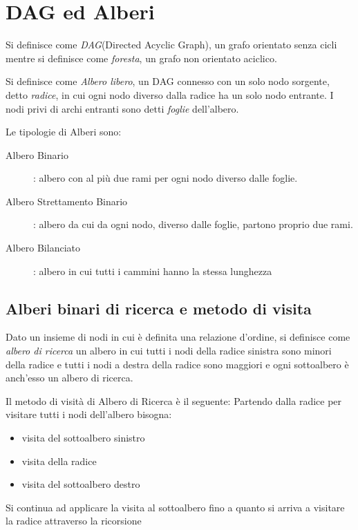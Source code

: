 \section{DAG ed Alberi}
Si definisce come \emph{DAG}(Directed Acyclic Graph), un grafo orientato senza cicli
mentre si definisce come \emph{foresta}, un grafo non orientato aciclico.

Si definisce come \emph{Albero libero}, un DAG connesso con un solo nodo sorgente, detto \emph{radice},
in cui ogni nodo diverso dalla radice ha un solo nodo entrante.\newline
I nodi privi di archi entranti sono detti \emph{foglie} dell'albero.


Le tipologie di Alberi sono:
\begin{description}
    \item[Albero Binario]: albero con al più due rami per ogni nodo diverso dalle foglie.
    \item[Albero Strettamento Binario]: albero da cui da ogni nodo, diverso dalle foglie, partono proprio due rami.
    \item[Albero Bilanciato]: albero in cui tutti i cammini hanno la stessa lunghezza
\end{description}



\subsection{Alberi binari di ricerca e metodo di visita}
Dato un insieme di nodi in cui è definita una relazione d'ordine, si definisce come
\emph{albero di ricerca} un albero in cui tutti i nodi della radice sinistra sono
minori della radice e tutti i nodi a destra della radice sono maggiori e ogni sottoalbero
è anch'esso un albero di ricerca.


Il metodo di visità di Albero di Ricerca è il seguente:\newline
Partendo dalla radice per visitare tutti i nodi dell'albero bisogna:
\begin{itemize}
    \item visita del sottoalbero sinistro
    \item visita della radice
    \item visita del sottoalbero destro
\end{itemize}
Si continua ad applicare la visita al sottoalbero fino a quanto si arriva a visitare la radice
attraverso la ricorsione

